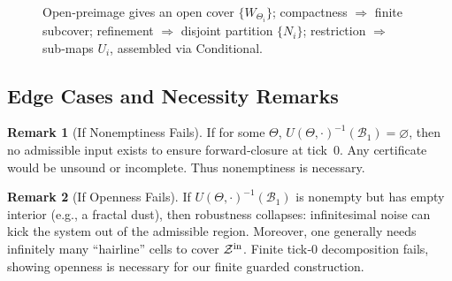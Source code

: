 \documentclass[12pt]{article}
\theoremstyle{definition}
\newtheorem{remark}{Remark}[section]
\theoremstyle{plain}
\begin{document}
\begin{figure}[h!]
\centering
{}
\caption{Open‑preimage gives an open cover $\{W_{\Theta_i}\}$; compactness $\Rightarrow$ finite subcover; refinement $\Rightarrow$ disjoint partition $\{N_i\}$; restriction $\Rightarrow$ sub‑maps $U_i$, assembled via Conditional.}
\end{figure}

\subsection{Edge Cases and Necessity Remarks}
\label{subsec:edge-cases}

\begin{remark}[If Nonemptiness Fails]
If for some $\Theta$, $U(\Theta,\cdot)^{-1}(\mathcal B_1)=\varnothing$, then no admissible input exists to ensure forward‑closure at tick 0.  Any certificate would be unsound or incomplete.  Thus nonemptiness is necessary.

\end{remark}

\begin{remark}[If Openness Fails]
If $U(\Theta,\cdot)^{-1}(\mathcal B_1)$ is nonempty but has empty interior (e.g., a fractal dust), then robustness collapses: infinitesimal noise can kick the system out of the admissible region.  Moreover, one generally needs infinitely many “hairline” cells to cover $\mathcal Z^{\rm in}$.  Finite tick‑0 decomposition fails, showing openness is necessary for our finite guarded construction.

\end{remark}
\end{document}
